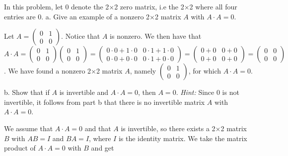 \documentclass[12pt]{article}
\newenvironment{problem}[2][Problem]
{
	\begin{trivlist} 
		\item[\hskip \labelsep {\bfseries #1 #2:}]
	}
{
	\end{trivlist}
	}
\newenvironment{solution}[1][Solution]
{
	\begin{trivlist} 
		\item[\hskip \labelsep {\itshape #1:}]
	}
	{
	\end{trivlist}
}
\begin{document}
\newpage
\begin{problem}{5}
In this problem, let 0 denote the 2$\times$2 zero matrix, i.e the  2$\times$2 where all four entries are 0.
\noindent
\newline
\newline
a. Give an example of a nonzero 2$\times$2 matrix $A$ with $A\cdot A=$0.
\begin{solution}
Let $A=\begin{pmatrix}0&1\\0&0 \end{pmatrix}$. Notice that $A$ is nonzero. We then have that $A\cdot A = \begin{pmatrix}0&1\\0&0 \end{pmatrix}\begin{pmatrix}0&1\\0&0 \end{pmatrix}=\begin{pmatrix}0\cdot 0 + 1 \cdot 0 & 0\cdot 1 + 1\cdot 0\\0\cdot 0 + 0\cdot 0&0\cdot 1 + 0\cdot 0 \end{pmatrix} = \begin{pmatrix}0+0 & 0+0\\0+0&0+0 \end{pmatrix} =\begin{pmatrix}0&0\\0&0 \end{pmatrix}$. We have found a nonzero 2$\times$2 matrix $A$, namely $\begin{pmatrix}0&1\\0&0 \end{pmatrix}$, for which $A\cdot A=$0.
\end{solution}
\noindent
\newline
\newline
b. Show that if $A$ is invertible and $A \cdot A=$0, then $A=$0.
\noindent
\newline
{\it Hint:} Since 0 is not invertible, it follows from part b that there is no invertible matrix $A$ with $A \cdot A=$0.
\begin{solution}
We assume that $A\cdot A = 0$ and that $A$ is invertible, so there exists a 2$\times$2 matrix $B$ with $AB=I$ and $BA=I$, where $I$ is the identity matrix. We take the matrix product of $A\cdot A = 0$ with $B$ and get

\end{solution}
\end{problem}
\end{document}
